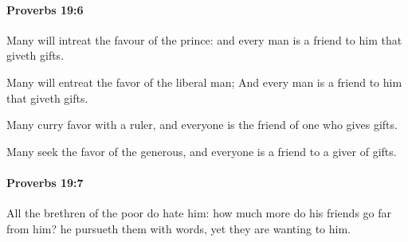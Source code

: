 		\paragraph{Proverbs 19:6} %
			\label{PROVERBS-19-6}

			Many will intreat the favour of the prince: and every man is a friend to him that giveth gifts.

			\begin{versebox}
					\item[BHS] 
					\item[ASV] Many will entreat the favor of the liberal man; And every man is a friend to him that giveth gifts.
					\item[NIV] Many curry favor with a ruler, and everyone is the friend of one who gives gifts.
					\item[NRSV] Many seek the favor of the generous, and everyone is a friend to a giver of gifts.
			\end{versebox}

		\paragraph{Proverbs 19:7} %
			\label{PROVERBS-19-7}

			All the brethren of the poor do hate him: how much more do his friends go far from him? he pursueth them with words, yet they are wanting to him.

